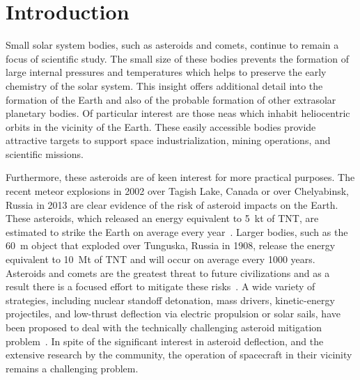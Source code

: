 
\chapter{Introduction}
Small solar system bodies, such as asteroids and comets, continue to remain a focus of scientific study.
The small size of these bodies prevents the formation of large internal pressures and temperatures which helps to preserve the early chemistry of the solar system.
This insight offers additional detail into the formation of the Earth and also of the probable formation of other extrasolar planetary bodies.
Of particular interest are those \glspl{nea} which inhabit heliocentric orbits in the vicinity of the Earth. 
These easily accessible bodies provide attractive targets to support space industrialization, mining operations, and scientific missions.

Furthermore, these asteroids are of keen interest for more practical purposes.
The recent meteor explosions in 2002 over Tagish Lake, Canada or over Chelyabinsk, Russia in 2013 are clear evidence of the risk of asteroid impacts on the Earth.
These asteroids, which released an energy equivalent to \SI{5}{\kilo\tonne} of TNT, are estimated to strike the Earth on average every year~\cite{brown2002}.
Larger bodies, such as the \SI{60}{\meter} object that exploded over Tunguska, Russia in 1908, release the energy equivalent to \SI{10}{\mega\tonne} of TNT and will occur on average every \num{1000} years.
Asteroids and comets are the greatest threat to future civilizations and as a result there is a focused effort to mitigate these risks~\cite{wie2008}.
A wide variety of strategies, including nuclear standoff detonation, mass drivers, kinetic-energy projectiles, and low-thrust deflection via electric propulsion or solar sails, have been proposed to deal with the technically challenging asteroid mitigation problem~\cite{adams2004}.
In spite of the significant interest in asteroid deflection, and the extensive research by the community, the operation of spacecraft in their vicinity remains a challenging problem.

